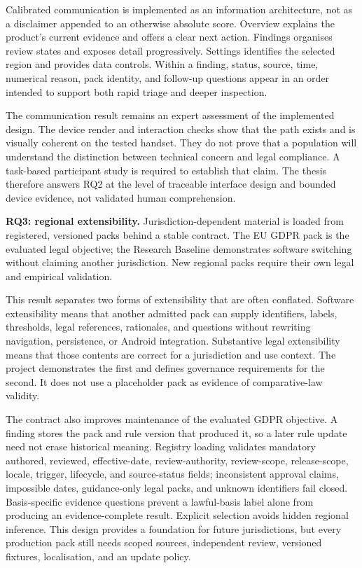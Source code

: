 Calibrated communication is implemented as an information architecture, not as a disclaimer appended to an otherwise absolute score. Overview explains the product's current evidence and offers a clear next action. Findings organises review states and exposes detail progressively. Settings identifies the selected region and provides data controls. Within a finding, status, source, time, numerical reason, pack identity, and follow-up questions appear in an order intended to support both rapid triage and deeper inspection.

The communication result remains an expert assessment of the implemented design. The device render and interaction checks show that the path exists and is visually coherent on the tested handset. They do not prove that a population will understand the distinction between technical concern and legal compliance. A task-based participant study is required to establish that claim. The thesis therefore answers RQ2 at the level of traceable interface design and bounded device evidence, not validated human comprehension.

\textbf{RQ3: regional extensibility.} Jurisdiction-dependent material is loaded from registered, versioned packs behind a stable contract. The EU GDPR pack is the evaluated legal objective; the Research Baseline demonstrates software switching without claiming another jurisdiction. New regional packs require their own legal and empirical validation.

This result separates two forms of extensibility that are often conflated. Software extensibility means that another admitted pack can supply identifiers, labels, thresholds, legal references, rationales, and questions without rewriting navigation, persistence, or Android integration. Substantive legal extensibility means that those contents are correct for a jurisdiction and use context. The project demonstrates the first and defines governance requirements for the second. It does not use a placeholder pack as evidence of comparative-law validity.

The contract also improves maintenance of the evaluated GDPR objective. A finding stores the pack and rule version that produced it, so a later rule update need not erase historical meaning. Registry loading validates mandatory authored, reviewed, effective-date, review-authority, review-scope, release-scope, locale, trigger, lifecycle, and source-status fields; inconsistent approval claims, impossible dates, guidance-only legal packs, and unknown identifiers fail closed. Basis-specific evidence questions prevent a lawful-basis label alone from producing an evidence-complete result. Explicit selection avoids hidden regional inference. This design provides a foundation for future jurisdictions, but every production pack still needs scoped sources, independent review, versioned fixtures, localisation, and an update policy.

